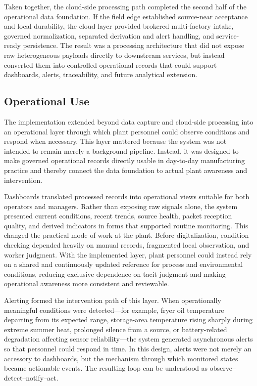 \documentclass[systems,article,submit,pdftex,moreauthors]{Definitions/mdpi}
\begin{document}
Taken together, the cloud-side processing path completed the second half of the operational data foundation. If the field edge established source-near acceptance and local durability, the cloud layer provided brokered multi-factory intake, governed normalization, separated derivation and alert handling, and service-ready persistence. The result was a processing architecture that did not expose raw heterogeneous payloads directly to downstream services, but instead converted them into controlled operational records that could support dashboards, alerts, traceability, and future analytical extension.



\subsection{Operational Use}
\label{sec:operational_use}

The implementation extended beyond data capture and cloud-side processing into an operational layer through which plant personnel could observe conditions and respond when necessary. This layer mattered because the system was not intended to remain merely a background pipeline. Instead, it was designed to make governed operational records directly usable in day-to-day manufacturing practice and thereby connect the data foundation to actual plant awareness and intervention.

Dashboards translated processed records into operational views suitable for both operators and managers. Rather than exposing raw signals alone, the system presented current conditions, recent trends, source health, packet reception quality, and derived indicators in forms that supported routine monitoring. This changed the practical mode of work at the plant. Before digitalization, condition checking depended heavily on manual records, fragmented local observation, and worker judgment. With the implemented layer, plant personnel could instead rely on a shared and continuously updated reference for process and environmental conditions, reducing exclusive dependence on tacit judgment and making operational awareness more consistent and reviewable.

Alerting formed the intervention path of this layer. When operationally meaningful conditions were detected---for example, fryer oil temperature departing from its expected range, storage-area temperature rising sharply during extreme summer heat, prolonged silence from a source, or battery-related degradation affecting sensor reliability---the system generated asynchronous alerts so that personnel could respond in time. In this design, alerts were not merely an accessory to dashboards, but the mechanism through which monitored states became actionable events. The resulting loop can be understood as observe--detect--notify--act.
\end{document}
